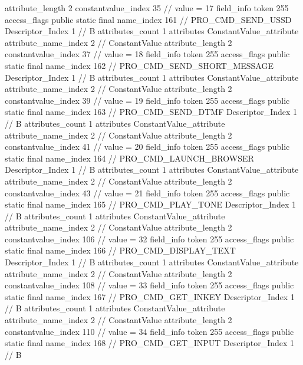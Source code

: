 {{{{{{{					attribute_length	2
					constantvalue_index	35		// value = 17
				}
				}
			}
			field_info {
				token	255
				access_flags	public static final
				name_index	161		// PRO_CMD_SEND_USSD
				Descriptor_Index	1		// B
				attributes_count	1
				attributes {
				ConstantValue_attribute {
					attribute_name_index	2		// ConstantValue
					attribute_length	2
					constantvalue_index	37		// value = 18
				}
				}
			}
			field_info {
				token	255
				access_flags	public static final
				name_index	162		// PRO_CMD_SEND_SHORT_MESSAGE
				Descriptor_Index	1		// B
				attributes_count	1
				attributes {
				ConstantValue_attribute {
					attribute_name_index	2		// ConstantValue
					attribute_length	2
					constantvalue_index	39		// value = 19
				}
				}
			}
			field_info {
				token	255
				access_flags	public static final
				name_index	163		// PRO_CMD_SEND_DTMF
				Descriptor_Index	1		// B
				attributes_count	1
				attributes {
				ConstantValue_attribute {
					attribute_name_index	2		// ConstantValue
					attribute_length	2
					constantvalue_index	41		// value = 20
				}
				}
			}
			field_info {
				token	255
				access_flags	public static final
				name_index	164		// PRO_CMD_LAUNCH_BROWSER
				Descriptor_Index	1		// B
				attributes_count	1
				attributes {
				ConstantValue_attribute {
					attribute_name_index	2		// ConstantValue
					attribute_length	2
					constantvalue_index	43		// value = 21
				}
				}
			}
			field_info {
				token	255
				access_flags	public static final
				name_index	165		// PRO_CMD_PLAY_TONE
				Descriptor_Index	1		// B
				attributes_count	1
				attributes {
				ConstantValue_attribute {
					attribute_name_index	2		// ConstantValue
					attribute_length	2
					constantvalue_index	106		// value = 32
				}
				}
			}
			field_info {
				token	255
				access_flags	public static final
				name_index	166		// PRO_CMD_DISPLAY_TEXT
				Descriptor_Index	1		// B
				attributes_count	1
				attributes {
				ConstantValue_attribute {
					attribute_name_index	2		// ConstantValue
					attribute_length	2
					constantvalue_index	108		// value = 33
				}
				}
			}
			field_info {
				token	255
				access_flags	public static final
				name_index	167		// PRO_CMD_GET_INKEY
				Descriptor_Index	1		// B
				attributes_count	1
				attributes {
				ConstantValue_attribute {
					attribute_name_index	2		// ConstantValue
					attribute_length	2
					constantvalue_index	110		// value = 34
				}
				}
			}
			field_info {
				token	255
				access_flags	public static final
				name_index	168		// PRO_CMD_GET_INPUT
				Descriptor_Index	1		// B
}}}}}
